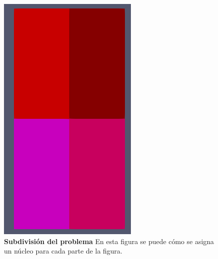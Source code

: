 \documentclass{article}
\begin{document}
\begin{figure}[H]
    \centering
    \includegraphics[scale=0.5]{../res/imgs/image5.png}
    \caption{\textbf{Subdivisión del problema }En esta figura se puede cómo se asigna un núcleo para cada parte de la figura.}
\end{figure}
\end{document}
